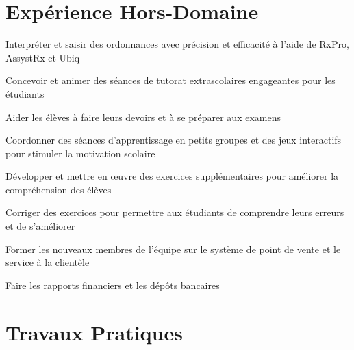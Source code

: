 \documentclass[letterpaper,10pt]{article}
\begin{document}
   \section{Expérience Hors-Domaine}

  \begin{resume_list}
    \item Interpréter et saisir des ordonnances avec précision et efficacité à l'aide de RxPro, AssystRx et Ubiq
  \end{resume_list}

  \begin{resume_list}
    \item Concevoir et animer des séances de tutorat extrascolaires engageantes pour les étudiants
    \item Aider les élèves à faire leurs devoirs et à se préparer aux examens
    \item Coordonner des séances d'apprentissage en petits groupes et des jeux interactifs pour stimuler la motivation scolaire
    \item Développer et mettre en œuvre des exercices supplémentaires pour améliorer la compréhension des élèves
    \item Corriger des exercices pour permettre aux étudiants de comprendre leurs erreurs et de s'améliorer
  \end{resume_list}

  \begin{resume_list}
    \item Former les nouveaux membres de l'équipe sur le système de point de vente et le service à la clientèle
    \item Faire les rapports financiers et les dépôts bancaires
  \end{resume_list}

  \pagebreak


  \section{Travaux Pratiques}
\end{document}
